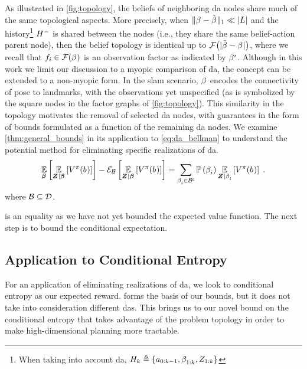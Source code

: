 As illustrated in \cref{fig:topology}, the beliefs of neighboring \gls{da} nodes share much of the same topological aspects. More precisely, when $\lVert\beta_{}^{}-\tilde{\beta_{}^{}}\rVert_{1}\ll\lvert L\rvert$ and the history\footnote{When taking into account \gls{da}, $H_{k}\triangleq\{{a_{0:k-1}},\beta_{1:k}^{},Z_{1:k}\}$} $H_{}^-$ is shared between the nodes (i.e., they share the same belief-action parent node), then the belief topology is identical up to
$\mathcal{F}\bigl(\lvert\tilde{\beta_{}^{}}-\beta_{}^{}\rvert\bigr)$, where we recall that $f_i\in\mathcal{F}(\beta_{}^{})$ is an observation factor as indicated by $\beta_{}^{i}$. Although in this work we limit our discussion to a myopic comparison of \gls{da}, the concept can be extended to a non-myopic form. In the \gls{slam} scenario, $\beta_{}^{}$ encodes the connectivity of pose to landmarks, with the observations yet unspecified (as is symbolized by the square nodes in the factor graphs of \cref{fig:topology}). This similarity in the topology motivates the removal of selected \gls{da} nodes, with guarantees in the form of bounds formulated as a function of the remaining \gls{da} nodes. We examine \cref{thm:general_bounds} in its application to \eqref{eq:da_bellman} to understand the potential method for eliminating specific realizations of \gls{da}.
\begin{equation}
	\label{eq:remove_da}
	\expectation{\expectation{V^\pi(\blf{})}{\observationsRV{}\mid\daRV{}{}}}{\daRV{}{}}-\partialexpectation{\expectation{V^\pi(\blf{})}{\observationsRV{}\mid\daRV{}{}}}{\subSpace}=\sum_{\da{i}{}\in\stcomp{\subSpace}}\measure{\da{i}{}}\expectation{V^\pi(\blf{})}{\observationsRV{}\mid\da{i}{}}\;.
\end{equation}
where $\mathcal B\subseteq\mathcal{D}$.

 is an equality as we have not yet bounded the expected value function. The next step is to bound the conditional expectation.

\subsection{Application to Conditional Entropy}

For an application of eliminating realizations of \gls{da}, we look to conditional entropy as our expected reward.  forms the basis of our bounds, but it does not take into consideration different \glspl{da}. This brings us to our novel bound on the conditional entropy that takes advantage of the problem topology in order to make high-dimensional planning more tractable.

